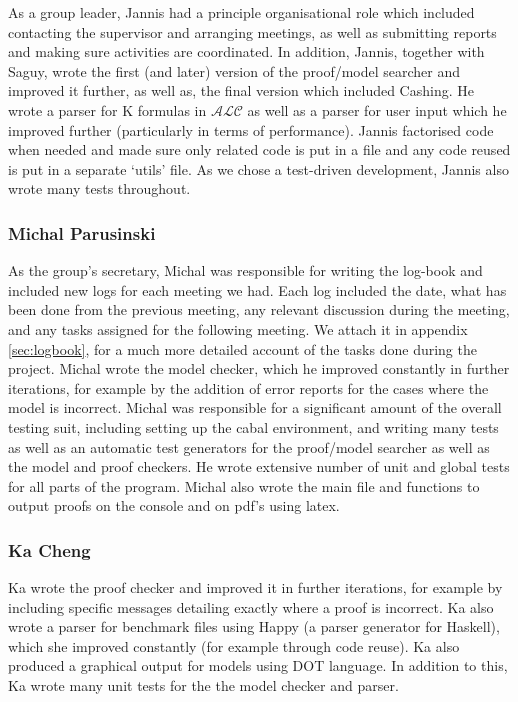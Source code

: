 As a group leader, Jannis had a principle organisational role which included contacting the supervisor and arranging meetings, as well as submitting reports and making sure activities are coordinated. In addition, Jannis, together with Saguy, wrote the first (and later) version of the proof/model searcher and improved it further, as well as, the final version which included Cashing. He wrote a parser for K formulas in $\mathcal{ALC}$ as well as a parser for user input which he improved further (particularly in terms of performance). Jannis factorised code when needed and made sure only related code is put in a file and any code reused is put in a separate `utils' file. As we chose a test-driven development, Jannis also wrote many tests throughout.

\subsubsection*{Michal Parusinski}

As the group's secretary, Michal was responsible for writing the log-book and included new logs for each meeting we had. Each log included the date, what has been done from the previous meeting, any relevant discussion during the meeting, and any tasks assigned for the following meeting. We attach it in appendix \ref{sec:logbook}, for a much more detailed account of the tasks done during the project. Michal wrote the model checker, which he improved constantly in further iterations, for example by the addition of error reports for the cases where the model is incorrect. Michal was responsible for a significant amount of the overall testing suit, including setting up the cabal environment, and writing many tests as well as an automatic test generators for the proof/model searcher as well as the model and proof checkers. He wrote extensive number of unit and global tests for all parts of the program. Michal also wrote the main file and functions to output proofs on the console and on pdf's using latex. 

\subsubsection*{Ka Cheng}

Ka wrote the proof checker and improved it in further iterations, for example by including specific messages detailing exactly where a proof is incorrect. Ka also wrote a parser for benchmark files using Happy (a parser generator for Haskell), which she improved constantly (for example through code reuse). Ka also produced a graphical output for models using DOT language. In addition to this, Ka wrote many unit tests for the the model checker and parser. 

